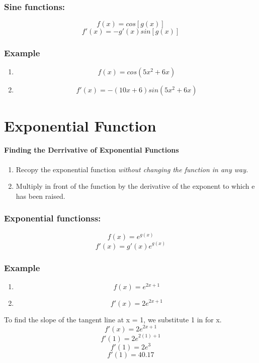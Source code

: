 \documentclass[a4paper,11pt]{book}
\begin{document}
\subsubsection{Sine functions:}
\LARGE 
\[ f(x) = cos[g(x)] \]
\[ f'(x) = -g'(x)sin[g(x)] \]

\subsubsection{Example}
\LARGE 
\begin{enumerate}
  \item \[ f(x) = cos(5x^2 + 6x) \]
  \item \[ f'(x) = -(10x + 6)sin(5x^2 + 6x) \]
\end{enumerate}
\normalsize 










\section{Exponential Function}
\paragraph{Finding the Derrivative of Exponential Functions}
\normalsize 
\begin{enumerate}
  \item Recopy the exponential function \textit{without changing the function in any way.}
  \item Multiply in front of the function by the derivative of the exponent to which e has been raised.
\end{enumerate}

\subsubsection{Exponential functionss:}
\LARGE 
\[ f(x) = {e}^{g(x)} \]
\[ f'(x) = {g'(x)e}^{g(x)} \]

\subsubsection{Example}
\LARGE 
\begin{enumerate}
  \item \[ f(x) = {e}^{2x+1} \]
  \item \[ f'(x) = {2e}^{2x+1} \]
\end{enumerate}
\normalsize 
To find the slope of the tangent line at x = 1, we substitute 1 in for x.
\LARGE 
\[ f'(x) = {2e}^{2x+1} \]
\[ f'(1) = {2e}^{2(1) + 1} \]
\[ f'(1) = {2e}^{3} \]
\[ f'(1) = 40.17 \]
\normalsize 
\end{document}
